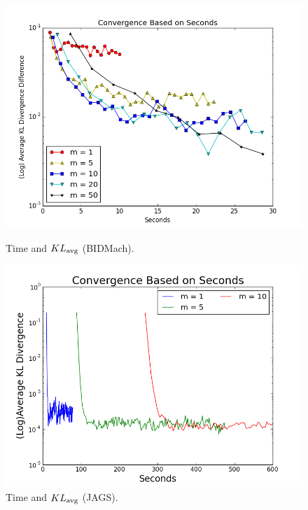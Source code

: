 \documentclass{article} %
\begin{document}
\begin{figure}[t]
  \centering
  \begin{minipage}{.5\textwidth}
    \centering
    \includegraphics[width=1\textwidth]{fig_kl_time_log}
    \caption{Time and $KL_{\rm avg}$ (BIDMach).}
    \label{fig:kl_time_bidmach}
  \end{minipage}\hfill
    \begin{minipage}{.5\textwidth}
    \centering
    \includegraphics[width=1\textwidth]{fig_kl_div_25_50_perc_jags_time}
    \caption{Time and $KL_{\rm avg}$ (JAGS).}
    \label{fig:kl_time_jags}
  \end{minipage}
\end{figure}
\end{document}
